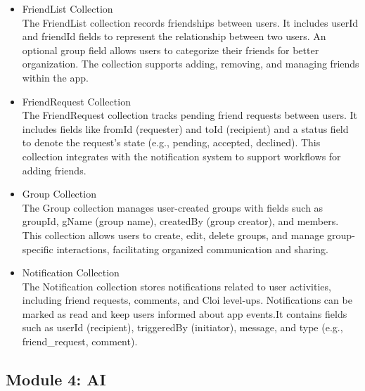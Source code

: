 \begin{itemize}
                \vspace{3mm}                
                \item FriendList Collection\\
                The FriendList collection records friendships between users. It includes userId and friendId fields to represent the relationship between two users. An optional group field allows users to categorize their friends for better organization. The collection supports adding, removing, and managing friends within the app.
                \vspace{3mm}                
                \item FriendRequest Collection\\
                The FriendRequest collection tracks pending friend requests between users. It includes fields like fromId (requester) and toId (recipient) and a status field to denote the request's state (e.g., pending, accepted, declined). This collection integrates with the notification system to support workflows for adding friends.
                \vspace{3mm}                
                \item Group Collection\\
                The Group collection manages user-created groups with fields such as groupId, gName (group name), createdBy (group creator), and members. This collection allows users to create, edit, delete groups, and manage group-specific interactions, facilitating organized communication and sharing.
                \vspace{3mm}     
                \item Notification Collection\\
                The Notification collection stores notifications related to user activities, including friend requests, comments, and Cloi level-ups. Notifications can be marked as read and keep users informed about app events.It contains fields such as userId (recipient), triggeredBy (initiator), message, and type (e.g., friend_request, comment).
                \vspace{3mm} 
  
            \end{itemize}
    \subsection{Module 4: AI}
